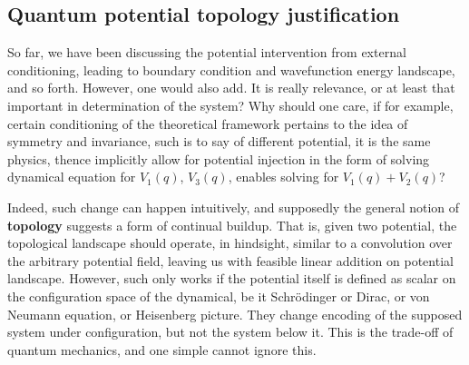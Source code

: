 \documentclass[%
 reprint,
 amsmath,amssymb,
 aps,
]{revtex4-2}
\begin{document}
\subsection{Quantum potential topology justification}

So far, we have been discussing the potential intervention from external conditioning, leading to boundary condition and wavefunction energy landscape, and so forth. However, one would also add. It is really relevance, or at least that important in determination of the system? Why should one care, if for example, certain conditioning of the theoretical framework pertains to the idea of symmetry and invariance, such is to say of different potential, it is the same physics, thence implicitly allow for potential injection in the form of solving dynamical equation for $V_{1}(q)$, $V_{3}(q)$, enables solving for $V_{1}(q)+V_{2}(q)$? 

Indeed, such change can happen intuitively, and supposedly the general notion of \textbf{topology} suggests a form of continual buildup. That is, given two potential, the topological landscape should operate, in hindsight, similar to a convolution over the arbitrary potential field, leaving us with feasible linear addition on potential landscape. However, such only works if the potential itself is defined as scalar on the configuration space of the dynamical, be it Schrödinger or Dirac, or von Neumann equation, or Heisenberg picture. They change encoding of the supposed system under configuration, but not the system below it. This is the trade-off of quantum mechanics, and one simple cannot ignore this. 
\end{document}
